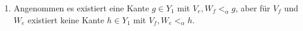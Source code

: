 \documentclass[12pt,titlepage]{article}
\begin{document}
\begin{bemerkung}
\begin{enumerate}
\begin{comment}
\definecolor{ududff}{rgb}{0.30196078431372547,0.30196078431372547,1.}
\definecolor{xdxdff}{rgb}{0.49019607843137253,0.49019607843137253,1.}
\definecolor{ffffqq}{rgb}{1.,1.,0.}
\begin{tikzpicture}[line cap=round,line join=round,>=triangle 45,x=1.4cm,y=1.4cm]
x=1.4cm,y=1.4cm,
axis lines=middle,
ymajorgrids=true,
xmajorgrids=true,
xmin=-2.9600000000000013,
xmax=7.400000000000004,
ymin=-0.5400000000000005,
ymax=4.2200000000000015,
xtick={-2.0,-1.0,...,8.0},
ytick={-2.0,-1.0,...,6.0},]
\clip(-2.96,-0.54) rectangle (7.4,4.22);
\fill[line width=2.pt,color=ffffqq,fill=ffffqq,fill opacity=0.550000011920929] (-2.,0.) -- (2.,0.) -- (2.,4.) -- (-2.,4.) -- cycle;
\fill[line width=2.pt,color=ffffqq,fill=ffffqq,fill opacity=0.550000011920929] (3.,0.) -- (7.,0.) -- (7.,4.) -- (3.,4.) -- cycle;
\draw [line width=2.pt] (0.,1.)-- (0.,3.);
\draw [line width=2.pt] (5.,3.)-- (5.,1.);
\begin{scriptsize}
\draw [fill=xdxdff] (0.,1.) circle (2.5pt);
\draw[color=black] (0.,0.77) node {$\{W_e,W_f\}$};
\draw [fill=xdxdff] (0.,3.) circle (2.5pt);
\draw[color=black] (0.14,3.37) node {$\{V_e,V_f\}$};
\draw[color=black] (0.38,2.17) node {$\{e,f\}$};
\draw [fill=ududff] (5.,3.) circle (2.5pt);
\draw[color=black] (5.14,3.37) node {$\{V_e,W_f\}$};
\draw [fill=ududff] (5.,1.) circle (2.5pt);
\draw[color=black] (5.,0.77) node {$\{V_f,W_e\}$};
\draw[color=black] (5.38,2.17) node {$\{e,f\}$};
\end{scriptsize}
\end{tikzpicture}
\end{comment}
\item Angenommen es existiert eine Kante $g\in Y_1$ mit $V_e,W_f <_{\alpha}g$, aber für $V_f$ und $W_e$ existiert keine Kante $h\in Y_1$ mit $V_f,W_e <_{\alpha} h$. \\
\begin{figure}[h]

\end{figure}
\end{enumerate}
\end{bemerkung}
\end{document}
